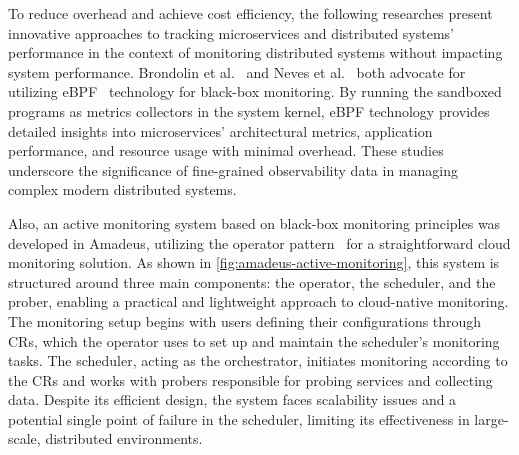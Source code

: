 To reduce overhead and achieve cost efficiency, the following researches present innovative approaches to tracking microservices and distributed systems' performance in the context of monitoring distributed systems without impacting system performance. Brondolin et al.~\parencite{brondolinBlackboxMonitoringApproach2020} and Neves et al.~\parencite{nevesDetailedBlackboxMonitoring2021} both advocate for utilizing \ac{eBPF}~\parencite{EBPFIntroductionTutorials} technology for black-box monitoring. By running the sandboxed programs as metrics collectors in the system kernel, \ac{eBPF} technology provides detailed insights into microservices' architectural metrics, application performance, and resource usage with minimal overhead. These studies underscore the significance of fine-grained observability data in managing complex modern distributed systems. 

Also, an active monitoring system based on black-box monitoring principles was developed in Amadeus, utilizing the operator pattern~\parencite{OperatorPattern} for a straightforward cloud monitoring solution. As shown in \autoref{fig:amadeus-active-monitoring}, this system is structured around three main components: the operator, the scheduler, and the prober, enabling a practical and lightweight approach to cloud-native monitoring. The monitoring setup begins with users defining their configurations through \ac{CR}s, which the operator uses to set up and maintain the scheduler's monitoring tasks. The scheduler, acting as the orchestrator, initiates monitoring according to the \ac{CR}s and works with probers responsible for probing services and collecting data. Despite its efficient design, the system faces scalability issues and a potential single point of failure in the scheduler, limiting its effectiveness in large-scale, distributed environments. 

